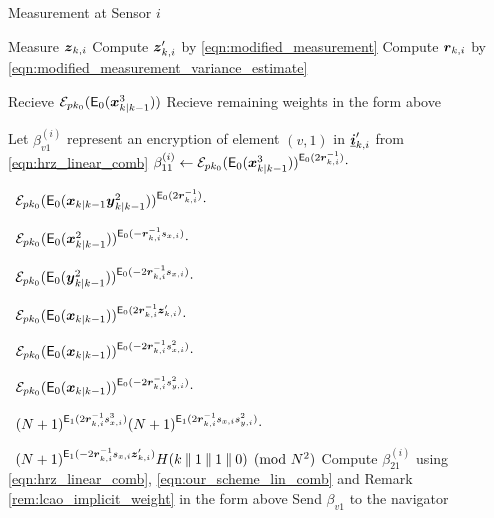 \documentclass[10pt,journal,compsoc]{IEEEtran}
\theoremstyle{definition}
\theoremstyle{definition}
\theoremstyle{remark}
\begin{document}
\begin{algorithm}[htbp]
\caption{Measurement at Sensor $i$}\label{alg:measurement_info}
\begin{algorithmic}[1]

    \State Measure ${\boldsymbol{z}}_{k,i}$
    \State Compute ${\boldsymbol{z}}_{k,i}'$ by \eqref{eqn:modified_measurement}
    \State Compute ${\boldsymbol{r}}_{k, i}$ by \eqref{eqn:modified_measurement_variance_estimate}

    \State Recieve $\mathcal{E}_{pk_0}(\mathsf{E}_{0}({\boldsymbol{x}}^3_{k|k-1}))$
    \State Recieve remaining weights in the form above
    \EndWhile

    \State Let $\beta_{v1}^{(i)}$ represent an encryption of element $(v,1)$ in ${\boldsymbol{\underline{i}}}'_{k,i}$ from \eqref{eqn:hrz_linear_comb}
    \State $\beta_{11}^{(i)} \gets \mathcal{E}_{pk_0}(\mathsf{E}_{0}({\boldsymbol{x}}^3_{k|k-1}))^{\mathsf{E}_{0}(2{\boldsymbol{r}}_{k, i}^{-1})}\cdot$\par
    \ $\mathcal{E}_{pk_0}(\mathsf{E}_{0}({\boldsymbol{x}}_{k|k-1}{\boldsymbol{y}}^2_{k|k-1}))^{\mathsf{E}_{0}(2{\boldsymbol{r}}_{k, i}^{-1})}\cdot$\par
    \ $\mathcal{E}_{pk_0}(\mathsf{E}_{0}({\boldsymbol{x}}^2_{k|k-1}))^{\mathsf{E}_{0}(-{\boldsymbol{r}}_{k, i}^{-1}s_{x,i})}\cdot$\par
    \ $\mathcal{E}_{pk_0}(\mathsf{E}_{0}({\boldsymbol{y}}^2_{k|k-1}))^{\mathsf{E}_{0}(-2{\boldsymbol{r}}_{k, i}^{-1}s_{x,i})}\cdot$\par
    \ $\mathcal{E}_{pk_0}(\mathsf{E}_{0}({\boldsymbol{x}}_{k|k-1}))^{\mathsf{E}_{0}(2{\boldsymbol{r}}_{k, i}^{-1}{\boldsymbol{z}}_{k,i}')}\cdot$\par
    \ $\mathcal{E}_{pk_0}(\mathsf{E}_{0}({\boldsymbol{x}}_{k|k-1}))^{\mathsf{E}_{0}(-2{\boldsymbol{r}}_{k, i}^{-1}s_{x,i}^2)}\cdot$\par
    \ $\mathcal{E}_{pk_0}(\mathsf{E}_{0}({\boldsymbol{x}}_{k|k-1}))^{\mathsf{E}_{0}(-2{\boldsymbol{r}}_{k, i}^{-1}s_{y,i}^2)}\cdot$\par
    \ $(N+1)^{\mathsf{E}_{1}(2{\boldsymbol{r}}_{k, i}^{-1}s_{x,i}^3)}
    (N+1)^{\mathsf{E}_{1}(2{\boldsymbol{r}}_{k, i}^{-1}s_{x,i}s_{y,i}^2)}\cdot$\par
    \ $(N+1)^{\mathsf{E}_{1}(-2{\boldsymbol{r}}_{k, i}^{-1}s_{x,i}{\boldsymbol{z}}_{k,i}')}
    H(k\mathbin\|1\mathbin\|1\mathbin\|0)\pmod{N^2}$
    \State Compute $\beta_{21}^{(i)}$ using \eqref{eqn:hrz_linear_comb}, \eqref{eqn:our_scheme_lin_comb} and Remark \ref{rem:lcao_implicit_weight} in the form above
        \State Send $\beta_{v1}$ to the navigator
    \EndFor


\end{algorithmic}
\end{algorithm}
\end{document}
